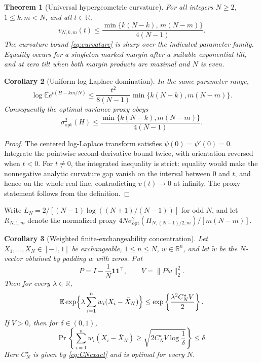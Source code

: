 \documentclass[11pt,a4paper]{article}
\newtheorem{theorem}{Theorem}[section]
\newtheorem{corollary}[theorem]{Corollary}
\newcommand{\E}{\mathbb E}\newcommand{\R}{\mathbb R}\newcommand{\N}{\mathbb N}\newcommand{\one}{\mathbf1}
\begin{document}
\begin{theorem}[Universal hypergeometric curvature]\label{thm:curvature}
For all integers $N\ge2$, $1\le k,m<N$, and all $t\in\R$,
\begin{equation}\label{eq:curvature}
 \boxed{\quad v_{N,k,m}(t)\le
 \frac{\min\{k(N-k),\,m(N-m)\}}{4(N-1)}.\quad}
\end{equation}
The curvature bound \eqref{eq:curvature} is sharp over the indicated parameter family. Equality occurs for a singleton marked margin after a suitable exponential tilt, and at zero tilt when both margin products are maximal and $N$ is even.
\end{theorem}

\begin{corollary}[Uniform log-Laplace domination]\label{cor:mgf}
In the same parameter range,
\begin{equation}\label{eq:mgf}
 \log\E e^{t(H-km/N)}\le
 \frac{t^2}{8(N-1)}\min\{k(N-k),m(N-m)\}.
\end{equation}
Consequently the optimal variance proxy obeys
\begin{equation}\label{eq:proxy}
 \sigma^2_{\mathrm{opt}}(H)\le
 \frac{\min\{k(N-k),m(N-m)\}}{4(N-1)}.
\end{equation}
\end{corollary}
\begin{proof}
The centered log-Laplace transform satisfies $\psi(0)=\psi'(0)=0$. Integrate the pointwise second-derivative bound twice, with orientation reversed when $t<0$. For $t\ne0$, the integrated inequality is strict: equality would make the nonnegative analytic curvature gap vanish on the interval between $0$ and $t$, and hence on the whole real line, contradicting $v(t)\to0$ at infinity. The proxy statement follows from the definition.
\end{proof}


Write $L_N=2/[(N-1)\log((N+1)/(N-1))]$ for odd $N$, and let $R_{N,1,m}$ denote the normalized proxy $4N\sigma^2_{\mathrm{opt}}(H_{N,(N-1)/2,m})/[m(N-m)]$.
\begin{corollary}[Weighted finite-exchangeability concentration]\label{cor:tail}
Let $X_1,\ldots,X_N\in[-1,1]$ be exchangeable, $1\le n\le N$, $w\in\R^n$, and let $\widetilde w$ be the $N$-vector obtained by padding $w$ with zeros. Put
\[
 P=I-\frac1N\one\one^\top,\qquad V=\|P\widetilde w\|_2^2.
\]
Then for every $\lambda\in\R$,
\[
 \E\exp\Bigl\{\lambda\sum_{i=1}^nw_i(X_i-\bar X_N)\Bigr\}
 \le\exp\left\{\frac{\lambda^2C_N^\star V}{2}\right\}.
\]
If $V>0$, then for $\delta\in(0,1)$,
\[
 \Pr\left\{\sum_{i=1}^nw_i(X_i-\bar X_N)\ge
 \sqrt{2C_N^\star V\log\frac1\delta}\right\}\le\delta.
\]
Here $C_N^\star$ is given by \eqref{eq:CNexact} and is optimal for every $N$.
\end{corollary}
\end{document}
